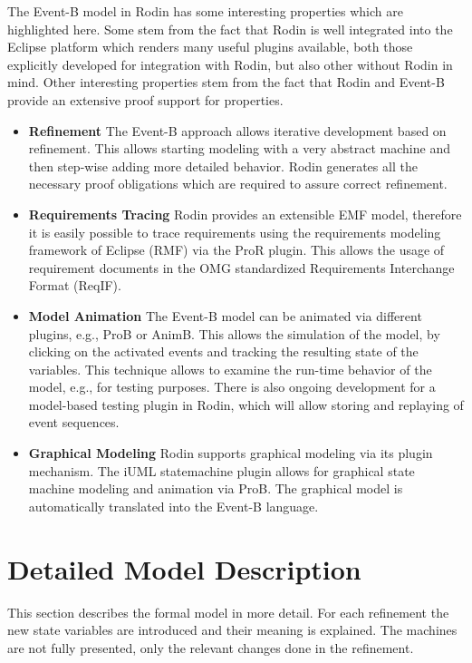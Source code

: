 \documentclass{template/openetcs_article}
\begin{document}
The Event-B model in Rodin has some interesting properties which are highlighted
here. Some stem from the fact that Rodin is well integrated into the Eclipse
platform which renders many useful plugins available, both those explicitly
developed for integration with Rodin, but also other without Rodin in mind.
Other interesting properties stem from the fact that Rodin and Event-B provide
an extensive proof support for properties.

\begin{itemize}
\item {\bf Refinement} The Event-B approach allows iterative development based
  on refinement. This allows starting modeling with a very abstract machine and
  then step-wise adding more detailed behavior. Rodin generates all the
  necessary proof obligations which are required to assure correct refinement.
\item {\bf Requirements Tracing} Rodin provides an extensible EMF model,
  therefore it is easily possible to trace requirements using the requirements
  modeling framework of Eclipse (RMF) via the ProR plugin. This allows the usage
  of requirement documents in the OMG standardized Requirements Interchange
  Format (ReqIF).
\item {\bf Model Animation} The Event-B model can be animated via different
  plugins, e.g., ProB or AnimB. This allows the simulation of the model, by
  clicking on the activated events and tracking the resulting state of the
  variables. This technique allows to examine the run-time behavior of the
  model, e.g., for testing purposes. There is also ongoing development for a
  model-based testing plugin in Rodin, which will allow storing and replaying of
  event sequences.
\item {\bf Graphical Modeling} Rodin supports graphical modeling via its plugin
  mechanism. The iUML statemachine plugin allows for graphical state machine
  modeling and animation via ProB. The graphical model is automatically
  translated into the Event-B language.
\end{itemize}

\section{Detailed Model Description}
\label{sec:deta-model-descr}

This section describes the formal model in more detail. For each refinement the
new state variables are introduced and their meaning is explained. The machines
are not fully presented, only the relevant changes done in the refinement.
\end{document}
